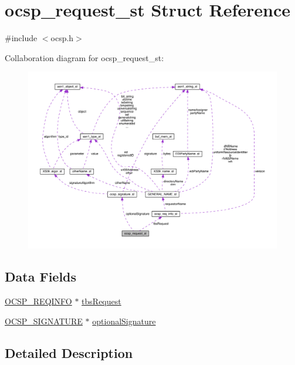 \hypertarget{structocsp__request__st}{}\section{ocsp\+\_\+request\+\_\+st Struct Reference}
\label{structocsp__request__st}


{\ttfamily \#include $<$ocsp.\+h$>$}



Collaboration diagram for ocsp\+\_\+request\+\_\+st\+:\nopagebreak
\begin{figure}[H]
\begin{center}
\leavevmode
\includegraphics[width=350pt]{structocsp__request__st__coll__graph}
\end{center}
\end{figure}
\subsection*{Data Fields}
\begin{DoxyCompactItemize}
\item 
\hyperlink{crypto_2ocsp_2ocsp_8h_a177b56d87f66e3148989e39382217b32}{O\+C\+S\+P\+\_\+\+R\+E\+Q\+I\+N\+FO} $\ast$ \hyperlink{structocsp__request__st_a5dfaf47cf2792320b373a320772adbd4}{tbs\+Request}
\item 
\hyperlink{crypto_2ocsp_2ocsp_8h_ac3d5728ce7956858c0441c1d8cad917e}{O\+C\+S\+P\+\_\+\+S\+I\+G\+N\+A\+T\+U\+RE} $\ast$ \hyperlink{structocsp__request__st_adbe38ae06d8f047fa589f9acf8d02779}{optional\+Signature}
\end{DoxyCompactItemize}


\subsection{Detailed Description}


